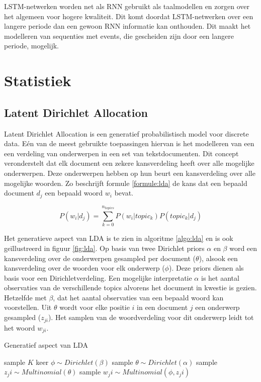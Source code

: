 LSTM-netwerken worden net als RNN gebruikt als taalmodellen en zorgen over het algemeen voor hogere kwaliteit. Dit komt doordat LSTM-netwerken over een langere periode dan een gewoon RNN informatie kan onthouden. Dit maakt het modelleren van sequenties met events, die gescheiden zijn door een langere periode, mogelijk.


\section{Statistiek}

\subsection{Latent Dirichlet Allocation}
Latent Dirichlet Allocation\cite{Blei2012} is een generatief probabilistisch model voor discrete data. E\'en van de meest gebruikte toepassingen hiervan is het modelleren van een een verdeling van onderwerpen in een set van tekstdocumenten. Dit concept veronderstelt dat elk document een zekere kansverdeling heeft over alle mogelijke onderwerpen. Deze onderwerpen hebben op hun beurt een kansverdeling over alle mogelijke woorden. Zo beschrijft formule \ref{formule:lda} de kans dat een bepaald document $d_j$ een bepaald woord $w_i$ bevat. 

\begin{equation}
    P(w_i | d_j) = \sum\limits_{k=0}^{n_{topics}}P(w_i|topic_k)P(topic_k|d_j)
    \label{formule:lda}
\end{equation}

Het generatieve aspect van LDA is te zien in algoritme \ref{algo:lda} en is ook ge\"illustreerd in figuur \ref{fig:lda}. Op basis van twee Dirichlet priors $\alpha$ en $\beta$ word een kansverdeling over de onderwerpen gesampled per document ($\theta$), alsook een kansverdeling over de woorden voor elk onderwerp ($\phi$). Deze priors dienen als basis voor een Dirichletverdeling. Een mogelijke interpretatie $\alpha$ is het aantal observaties van de verschillende topics alvorens het document in kwestie is gezien. Hetzelfde met $\beta$, dat het aantal observaties van een bepaald woord kan voorstellen. Uit $\theta$ wordt voor elke positie $i$ in een document $j$ een onderwerp gesampled ($z_{ji}$). Het samplen van de woordverdeling voor dit onderwerp leidt tot het woord $w_{ji}$. 

\begin{algorithm}
\caption{Generatief aspect van LDA}
\begin{algorithmic} 
\STATE sample $K$ keer  $\phi \sim Dirichlet(\beta)$
\STATE sample $\theta \sim Dirichlet(\alpha)$
\STATE sample $z_ji \sim Multinomial(\theta)$
\STATE sample $w_ji \sim Multinomial(\phi,z_ji)$
\ENDFOR
\ENDFOR
\end{algorithmic}
\label{algo:lda}
\end{algorithm}

